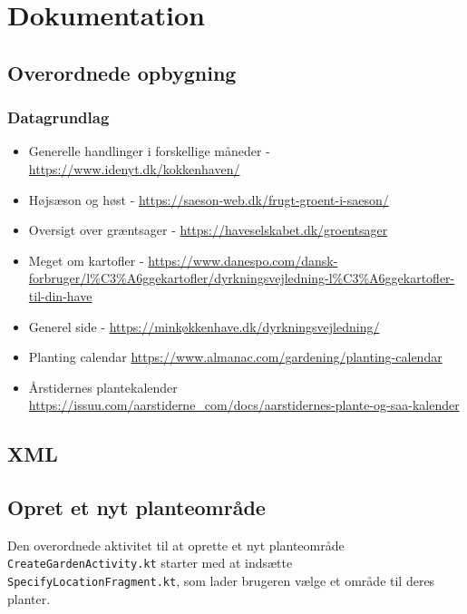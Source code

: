 \newpage
\section{Dokumentation}

\subsection{Overordnede opbygning}

\subsubsection{Datagrundlag}
\begin{itemize}
    \item Generelle handlinger i forskellige måneder - \hyperlink{https://www.idenyt.dk/kokkenhaven/}{https://www.idenyt.dk/kokkenhaven/}
    \item Højsæson og høst - \hyperlink{https://saeson-web.dk/frugt-groent-i-saeson/}{https://saeson-web.dk/frugt-groent-i-saeson/}
    \item Oversigt over græntsager - \hyperlink{https://haveselskabet.dk/groentsager}{https://haveselskabet.dk/groentsager}
    \item Meget om kartofler - \hyperlink{https://www.danespo.com/dansk-forbruger/l\%C3\%A6ggekartofler/dyrkningsvejledning-l\%C3\%A6ggekartofler-til-din-have}{https://www.danespo.com/dansk-forbruger/l\%C3\%A6ggekartofler/dyrkningsvejledning-l\%C3\%A6ggekartofler-til-din-have}
    \item Generel side - \hyperlink{https://minkøkkenhave.dk/dyrkningsvejledning/}{https://minkøkkenhave.dk/dyrkningsvejledning/}
    \item Planting calendar \hyperlink{https://www.almanac.com/gardening/planting-calendar}{https://www.almanac.com/gardening/planting-calendar}
    \item Årstidernes plantekalender \hyperlink{https://issuu.com/aarstiderne\_com/docs/aarstidernes-plante-og-saa-kalender}{https://issuu.com/aarstiderne\_com/docs/aarstidernes-plante-og-saa-kalender}
\end{itemize}

\subsection{XML}

\subsection{Opret et nyt planteområde}
Den overordnede aktivitet til at oprette et nyt planteområde \texttt{CreateGardenActivity.kt} starter med at indsætte \texttt{SpecifyLocationFragment.kt}, som lader brugeren vælge et område til deres planter.

